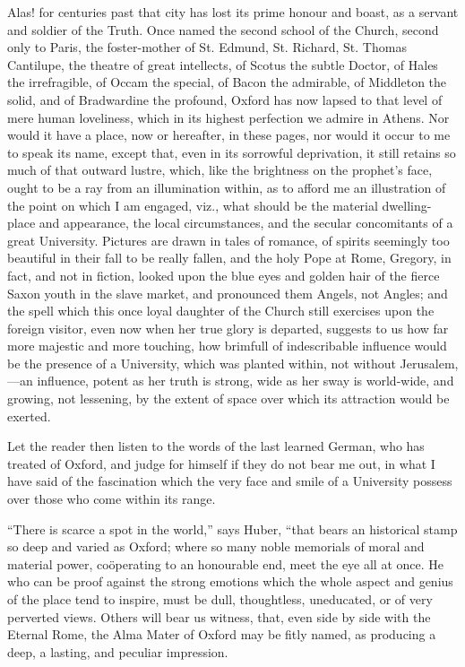 Alas! for centuries past that city has lost its prime honour and
boast, as a servant and soldier of the Truth. Once named the second
school of the Church, second only to Paris, the foster-mother of St.
Edmund, St. Richard, St. Thomas Cantilupe, the theatre of great
intellects, of Scotus the subtle Doctor, of Hales the irrefragible, of
Occam the special, of Bacon the admirable, of Middleton the solid, and
of Bradwardine the profound, Oxford has now lapsed to that level of
mere human loveliness, which in its highest perfection we admire in
Athens. Nor would it have a place, now or hereafter, in these pages,
nor would it occur to me to speak its name, except that, even in its
sorrowful deprivation, it still retains so much of that outward lustre,
which, like the brightness on the prophet's face, ought to be a ray
from an illumination within, as to afford me an illustration of the
point on which I am engaged, viz., what should be the material
dwelling-place and appearance, the local circumstances, and the
secular concomitants of a great University. Pictures are drawn in
tales of romance, of spirits seemingly too beautiful in their fall to
be really fallen, and the holy Pope at Rome, Gregory, in fact,
and not in fiction, looked upon the blue eyes and golden hair of the
fierce Saxon youth in the slave market, and pronounced them Angels,
not Angles; and the spell which this once loyal daughter of the Church
still exercises upon the foreign visitor, even now when her true glory
is departed, suggests to us how far more majestic and more touching,
how brimfull of indescribable influence would be the presence of a
University, which was planted within, not without Jerusalem,—an
influence, potent as her truth is strong, wide as her sway is
world-wide, and growing, not lessening, by the extent of space over
which its attraction would be exerted.

Let the reader then listen to the words of the last learned German,
who has treated of Oxford, and judge for himself if they do not bear
me out, in what I have said of the fascination which the very face and
smile of a University possess over those who come within its range.

``There is scarce a spot in the world,'' says Huber,
``that bears an historical stamp so deep and varied as Oxford;
where so many noble memorials of moral and material power,
coöperating to an honourable end, meet the eye all at once. He who
can be proof against the strong emotions which the whole aspect and
genius of the place tend to inspire, must be dull, thoughtless,
uneducated, or of very perverted views. Others will bear us witness,
that, even side by side with the Eternal Rome, the Alma Mater of
Oxford may be fitly named, as producing a deep, a lasting, and
peculiar impression.

